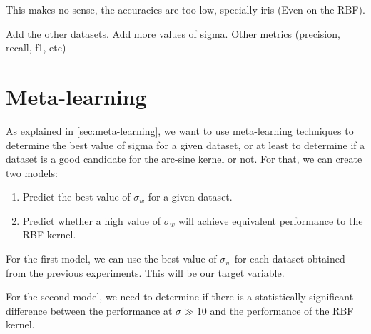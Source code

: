 \begin{marker}
    This makes no sense, the accuracies are too low, specially iris (Even on the
    RBF).

    Add the other datasets.
    Add more values of sigma.
    Other metrics (precision, recall, f1, etc)
\end{marker}

\section{Meta-learning}

As explained in \cref{sec:meta-learning}, we want to use meta-learning
techniques to determine the best value of sigma for a given dataset, or at least
to determine if a dataset is a good candidate for the arc-sine kernel or not.
For that, we can create two models:
\begin{enumerate}
    \item Predict the best value of $\sigma_w$ for a given dataset.
    \item Predict whether a high value of $\sigma_w$ will achieve equivalent
          performance to the RBF kernel.
\end{enumerate}

For the first model,
we can use the best value of $\sigma_w$ for each dataset
obtained from the previous experiments. This will be our target
variable.

For the second model, we need to determine if there is a statistically
significant difference between the performance at $\sigma \gg 10$ and the
performance of the RBF kernel.




